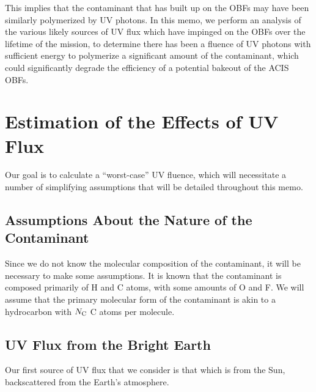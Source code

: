 \documentclass[11pt]{article}
\begin{document}
This implies that the contaminant that has built up on the OBFs may have been similarly
polymerized by UV photons. In this memo, we perform an analysis of the various likely
sources of UV flux which have impinged on the OBFs over the lifetime of the mission,
to determine there has been a fluence of UV photons with sufficient energy to polymerize
a significant amount of the contaminant, which could significantly degrade the efficiency
of a potential bakeout of the ACIS OBFs.

\section{Estimation of the Effects of UV Flux}

Our goal is to calculate a ``worst-case'' UV fluence, which will necessitate a
number of simplifying assumptions that will be detailed throughout this memo.

\subsection{Assumptions About the Nature of the Contaminant}

Since we do not know the molecular composition of the contaminant, it will be necessary to make
some assumptions. It is known that the contaminant is composed primarily of H and C atoms,
with some amounts of O and F. We will assume that the primary molecular form of the contaminant
is akin to a hydrocarbon with $N_{\rm C}$ C atoms per molecule.

\subsection{UV Flux from the Bright Earth}

Our first source of UV flux that we consider is that which is from the Sun, backscattered
from the Earth's atmosphere.
\end{document}
